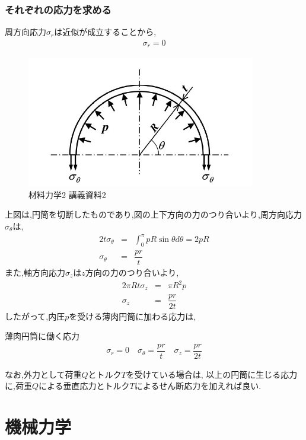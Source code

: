 \documentclass[a4paper]{jsarticle}
\begin{document}
\subsubsection{それぞれの応力を求める}
周方向応力$\sigma_r$は近似が成立することから,
\begin{eqnarray*}
    \sigma_r=0
\end{eqnarray*}
\newpage
\begin{figure}[htbp]
    \begin{center}
        \includegraphics[width=100mm]{images/zairiki_image2.jpg}
        \caption{材料力学2 講義資料2}
    \end{center}
\end{figure}
上図は,円筒を切断したものであり,図の上下方向の力のつり合いより,周方向応力$\sigma_\theta$は,
\begin{eqnarray*}
    \displaystyle
    2t\sigma_\theta &=& \int^\pi_0 pR\sin\theta d\theta = 2pR\\
    \sigma_\theta &=&\dfrac{pr}{t}
\end{eqnarray*}
また,軸方向応力$\sigma_z$は$z$方向の力のつり合いより,
\begin{eqnarray*}
    2\pi Rt \sigma_z&=& \pi R^2p\\
    \sigma_z&=&\dfrac{pr}{2t}
\end{eqnarray*}
したがって,内圧$p$を受ける薄肉円筒に加わる応力は,
\begin{itembox}[l]{薄肉円筒に働く応力}
    \begin{eqnarray*}
        \sigma_r=0\quad
        \sigma_\theta =\dfrac{pr}{t}\quad
        \sigma_z=\dfrac{pr}{2t}
    \end{eqnarray*}
\end{itembox}
なお,外力として荷重$Q$とトルク$T$を受けている場合は,
以上の円筒に生じる応力に,荷重$Q$による垂直応力とトルク$T$によるせん断応力を加えれば良い.
\newpage
\section{機械力学}
\end{document}
